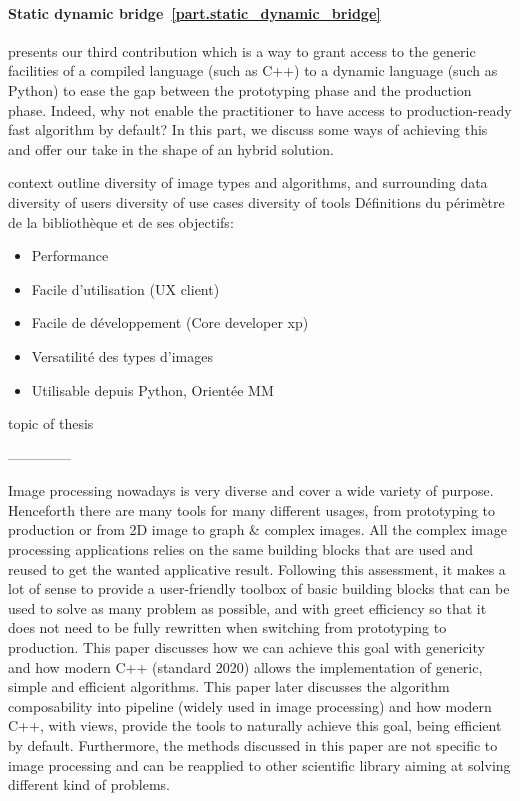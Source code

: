 \paragraph{Static dynamic bridge~\ref{part.static_dynamic_bridge}} presents our third contribution which is a way to
grant access to the generic facilities of a compiled language (such as C++) to a dynamic language (such as Python) to
ease the gap between the prototyping phase and the production phase. Indeed, why not enable the practitioner to have
access to production-ready fast algorithm by default? In this part, we discuss some ways of achieving this and offer our
take in the shape of an hybrid solution.


context
outline
diversity of image types and algorithms, and surrounding data
diversity of users
diversity of use cases
diversity of tools
Définitions du périmètre de la bibliothèque et de ses objectifs:
\begin{itemize}
  \item Performance
  \item Facile d'utilisation (UX client)
  \item Facile de développement (Core developer xp)
  \item Versatilité des types d'images
  \item Utilisable depuis Python, Orientée MM
\end{itemize}
topic of thesis



--------------

Image processing nowadays is very diverse and cover a wide variety of purpose. Henceforth there are many tools for many
different usages, from prototyping to production or from 2D image to graph \& complex images. All the complex image
processing applications relies on the same building blocks that are used and reused to get the wanted applicative
result. Following this assessment, it makes a lot of sense to provide a user-friendly toolbox of basic building blocks
that can be used to solve as many problem as possible, and with greet efficiency so that it does not need to be fully
rewritten when switching from prototyping to production. This paper discusses how we can achieve this goal with
genericity and how modern C++ (standard 2020) allows the implementation of generic, simple and efficient algorithms.
This paper later discusses the algorithm composability into pipeline (widely used in image processing) and how modern
C++, with views, provide the tools to naturally achieve this goal, being efficient by default. Furthermore, the methods
discussed in this paper are not specific to image processing and can be reapplied to other scientific library aiming at
solving different kind of problems.

